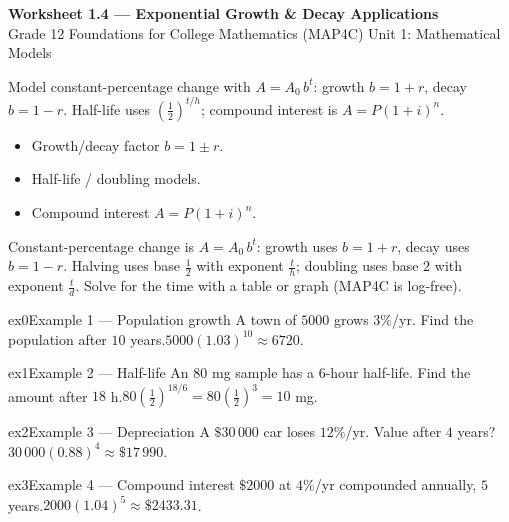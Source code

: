 \documentclass[11pt]{article}
\begin{document}
\begin{center}
{\LARGE\bfseries\color{titleblue}Worksheet 1.4 --- Exponential Growth \& Decay Applications}\\[2pt]
{\small Grade 12 Foundations for College Mathematics (MAP4C) \textperiodcentered{} Unit 1: Mathematical Models}
\end{center}

\begin{ideabox}
Model constant-percentage change with $A=A_0\,b^{t}$: growth $b=1+r$, decay $b=1-r$. Half-life uses $\left(\tfrac12\right)^{t/h}$; compound interest is $A=P(1+i)^n$.
\begin{itemize}[leftmargin=*,itemsep=2pt]
  \item Growth/decay factor $b=1\pm r$.
  \item Half-life / doubling models.
  \item Compound interest $A=P(1+i)^n$.
\end{itemize}
\end{ideabox}

\begin{learnbox}
Constant-percentage change is $A=A_0\,b^{t}$: growth uses $b=1+r$, decay uses $b=1-r$.
Halving uses base $\tfrac12$ with exponent $\tfrac{t}{h}$; doubling uses base $2$ with exponent $\tfrac{t}{d}$.
Solve for the time with a table or graph (MAP4C is log-free).
\end{learnbox}


\begin{example}{ex0}{Example 1 --- Population growth}
A town of $5000$ grows $3\%$/yr. Find the population after $10$ years.\soln $5000(1.03)^{10}\approx6720$.
\end{example}

\begin{example}{ex1}{Example 2 --- Half-life}
An $80$ mg sample has a $6$-hour half-life. Find the amount after $18$ h.\soln $80\left(\tfrac12\right)^{18/6}=80\left(\tfrac12\right)^{3}=10$ mg.
\end{example}

\begin{example}{ex2}{Example 3 --- Depreciation}
A $\$30\,000$ car loses $12\%$/yr. Value after $4$ years?\soln $30\,000(0.88)^{4}\approx\$17\,990$.
\end{example}

\begin{example}{ex3}{Example 4 --- Compound interest}
$\$2000$ at $4\%$/yr compounded annually, $5$ years.\soln $2000(1.04)^{5}\approx\$2433.31$.
\end{example}
\end{document}
